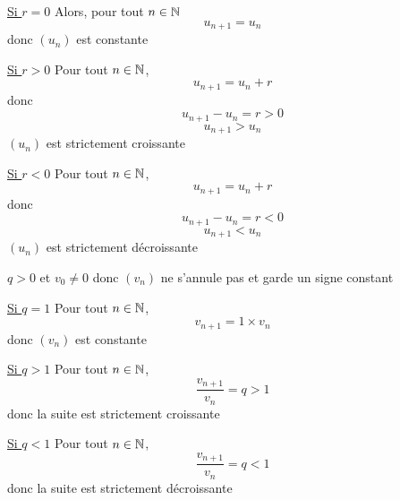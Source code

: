 \begin{preuve}
\underline{Si $r=0$}\newline
Alors, pour tout $n\in\mathbb{N}$
$$u_{n+1} = u_n$$
donc $(u_n)$ est constante\newline

\underline{Si $r>0$}\newline
Pour tout $n\in\mathbb{N}$, 
$$u_{n+1} = u_{n} + r$$
donc
$$u_{n+1} - u_{n} = r > 0$$
$$u_{n+1} > u_n$$
$(u_n)$ est strictement croissante\newline

\underline{Si $r<0$}\newline
Pour tout $n\in\mathbb{N}$, 
$$u_{n+1} = u_{n} + r$$
donc
$$u_{n+1} - u_{n} = r < 0$$
$$u_{n+1} < u_n$$
$(u_n)$ est strictement décroissante
\end{preuve}
\newline


\begin{preuve}
$q > 0$ et $v_0 \neq 0$ donc $(v_n)$ ne s'annule pas et garde un signe constant\newline

\underline{Si $q=1$}\newline
Pour tout $n\in\mathbb{N}$,
$$v_{n+1} = 1\times v_n$$
donc $(v_n)$ est constante\newline

\underline{Si $q>1$}\newline
Pour tout $n\in\mathbb{N}$,
$$\dfrac{v_{n+1}}{v_n} = q > 1$$ donc la suite est strictement croissante\newline

\underline{Si $q<1$}\newline
Pour tout $n\in\mathbb{N}$,
$$\dfrac{v_{n+1}}{v_n} = q < 1$$ donc la suite est strictement décroissante
\end{preuve}
